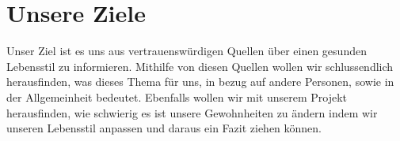\chapter{Unsere Ziele}
\chapterauthor{\bastian}
Unser Ziel ist es uns aus vertrauenswürdigen Quellen über einen gesunden Lebensstil zu informieren. Mithilfe von diesen Quellen wollen wir schlussendlich herausfinden, was dieses Thema für uns, in bezug auf andere Personen, sowie in der Allgemeinheit bedeutet.
\newline
Ebenfalls wollen wir mit unserem Projekt herausfinden, wie schwierig es ist unsere Gewohnheiten zu ändern indem wir unseren Lebensstil anpassen und daraus ein Fazit ziehen können.